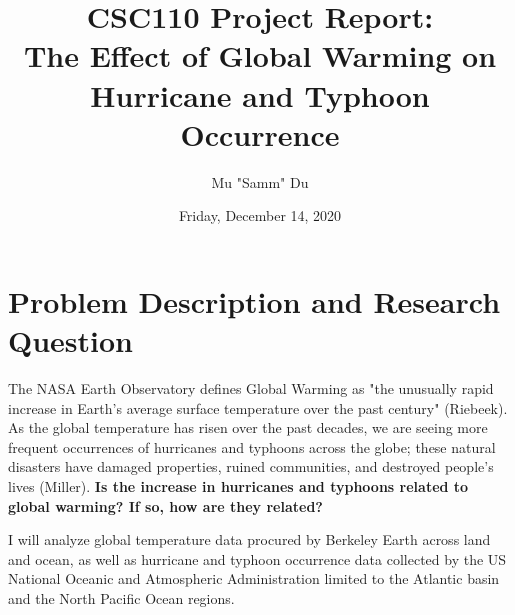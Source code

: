 \documentclass[fontsize=11pt]{article}
\title{CSC110 Project Report: \\The Effect of Global Warming on Hurricane and Typhoon Occurrence}
\author{Mu "Samm" Du}
\date{Friday, December 14, 2020}
\begin{document}
\maketitle

\section*{Problem Description and Research Question}

\qquad The NASA Earth Observatory defines Global Warming as "the unusually rapid increase in Earth’s average surface temperature over the past century" (Riebeek). As the global temperature has risen over the past decades, we are seeing more frequent occurrences of hurricanes and typhoons across the globe; these natural disasters have damaged properties, ruined communities, and destroyed people's lives (Miller). \textbf{Is the increase in hurricanes and typhoons related to global warming? If so, how are they related?}

\enspace I will analyze global temperature data procured by Berkeley Earth across land and ocean, as well as hurricane and typhoon occurrence data collected by the US National Oceanic and Atmospheric Administration limited to the Atlantic basin and the North Pacific Ocean regions.
\end{document}
